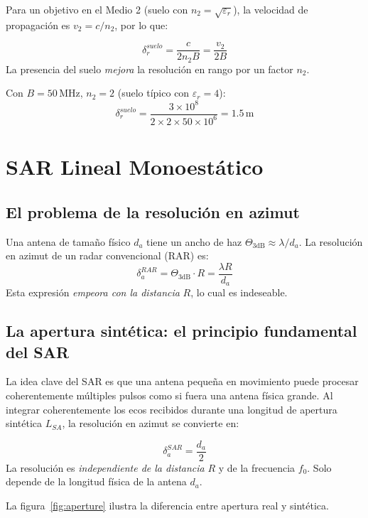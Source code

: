 \documentclass[12pt,a4paper,oneside]{book}
\newcommand{\result}[2]{%
  \begin{tcolorbox}[enhanced, breakable,
    colback=yellow!8, colframe=orange!70!black,
    fonttitle=\bfseries,
    title={\protect#1},
    attach boxed title to top left={yshift=-2mm, xshift=5mm},
    boxed title style={colback=orange!70!black}]
    #2
  \end{tcolorbox}}
\newcommand{\nota}[2]{%
  \begin{tcolorbox}[enhanced, breakable,
    colback=green!5, colframe=green!50!black,
    fonttitle=\bfseries\small,
    title={\protect#1}]
    #2
  \end{tcolorbox}}
\begin{document}
Para un objetivo en el Medio 2 (suelo con $n_2 = \sqrt{\varepsilon_r}$), la velocidad de propagación es $v_2 = c/n_2$, por lo que:

\result{Resolución en Rango en el Suelo}{
\[
\boxed{\delta_r^{suelo} = \frac{c}{2n_2 B} = \frac{v_2}{2B}}
\]
La presencia del suelo \emph{mejora} la resolución en rango por un factor $n_2$.
}

\nota{Ejemplo numérico}{
Con $B = 50\,\text{MHz}$, $n_2 = 2$ (suelo típico con $\varepsilon_r = 4$):
\[
\delta_r^{suelo} = \frac{3\times10^8}{2 \times 2 \times 50\times10^6} = 1.5\,\text{m}
\]
}

\chapter{SAR Lineal Monoestático}

\section{El problema de la resolución en azimut}

Una antena de tamaño físico $d_a$ tiene un ancho de haz $\Theta_{3\text{dB}} \approx \lambda/d_a$. La resolución en azimut de un radar convencional (RAR) es:
\[
\delta_a^{RAR} = \Theta_{3\text{dB}}\cdot R = \frac{\lambda R}{d_a}
\]
Esta expresión \emph{empeora con la distancia} $R$, lo cual es indeseable.

\section{La apertura sintética: el principio fundamental del SAR}

La idea clave del SAR es que una antena pequeña en movimiento puede procesar coherentemente múltiples pulsos como si fuera una antena física grande. Al integrar coherentemente los ecos recibidos durante una longitud de apertura sintética $L_{SA}$, la resolución en azimut se convierte en:

\result{Resolución en Azimut SAR (Stripmap)}{
\[
\boxed{\delta_a^{SAR} = \frac{d_a}{2}}
\]
La resolución es \emph{independiente de la distancia} $R$ y de la frecuencia $f_0$. Solo depende de la longitud física de la antena $d_a$.
}

La figura~\ref{fig:aperture} ilustra la diferencia entre apertura real y sintética.
\end{document}
